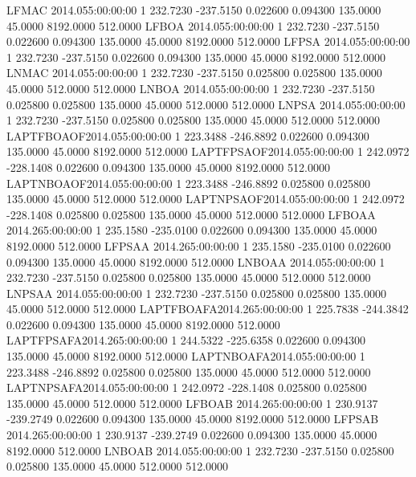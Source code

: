 LFMAC     2014.055:00:00:00  1    232.7230   -237.5150    0.022600    0.094300    135.0000     45.0000   8192.0000    512.0000
LFBOA     2014.055:00:00:00  1    232.7230   -237.5150    0.022600    0.094300    135.0000     45.0000   8192.0000    512.0000
LFPSA     2014.055:00:00:00  1    232.7230   -237.5150    0.022600    0.094300    135.0000     45.0000   8192.0000    512.0000
LNMAC     2014.055:00:00:00  1    232.7230   -237.5150    0.025800    0.025800    135.0000     45.0000    512.0000    512.0000
LNBOA     2014.055:00:00:00  1    232.7230   -237.5150    0.025800    0.025800    135.0000     45.0000    512.0000    512.0000
LNPSA     2014.055:00:00:00  1    232.7230   -237.5150    0.025800    0.025800    135.0000     45.0000    512.0000    512.0000
LAPTFBOAOF2014.055:00:00:00  1    223.3488   -246.8892    0.022600    0.094300    135.0000     45.0000   8192.0000    512.0000
LAPTFPSAOF2014.055:00:00:00  1    242.0972   -228.1408    0.022600    0.094300    135.0000     45.0000   8192.0000    512.0000
LAPTNBOAOF2014.055:00:00:00  1    223.3488   -246.8892    0.025800    0.025800    135.0000     45.0000    512.0000    512.0000
LAPTNPSAOF2014.055:00:00:00  1    242.0972   -228.1408    0.025800    0.025800    135.0000     45.0000    512.0000    512.0000
LFBOAA    2014.265:00:00:00  1    235.1580   -235.0100    0.022600    0.094300    135.0000     45.0000   8192.0000    512.0000
LFPSAA    2014.265:00:00:00  1    235.1580   -235.0100    0.022600    0.094300    135.0000     45.0000   8192.0000    512.0000
LNBOAA    2014.055:00:00:00  1    232.7230   -237.5150    0.025800    0.025800    135.0000     45.0000    512.0000    512.0000
LNPSAA    2014.055:00:00:00  1    232.7230   -237.5150    0.025800    0.025800    135.0000     45.0000    512.0000    512.0000
LAPTFBOAFA2014.265:00:00:00  1    225.7838   -244.3842    0.022600    0.094300    135.0000     45.0000   8192.0000    512.0000
LAPTFPSAFA2014.265:00:00:00  1    244.5322   -225.6358    0.022600    0.094300    135.0000     45.0000   8192.0000    512.0000
LAPTNBOAFA2014.055:00:00:00  1    223.3488   -246.8892    0.025800    0.025800    135.0000     45.0000    512.0000    512.0000
LAPTNPSAFA2014.055:00:00:00  1    242.0972   -228.1408    0.025800    0.025800    135.0000     45.0000    512.0000    512.0000
LFBOAB    2014.265:00:00:00  1    230.9137   -239.2749    0.022600    0.094300    135.0000     45.0000   8192.0000    512.0000
LFPSAB    2014.265:00:00:00  1    230.9137   -239.2749    0.022600    0.094300    135.0000     45.0000   8192.0000    512.0000
LNBOAB    2014.055:00:00:00  1    232.7230   -237.5150    0.025800    0.025800    135.0000     45.0000    512.0000    512.0000
